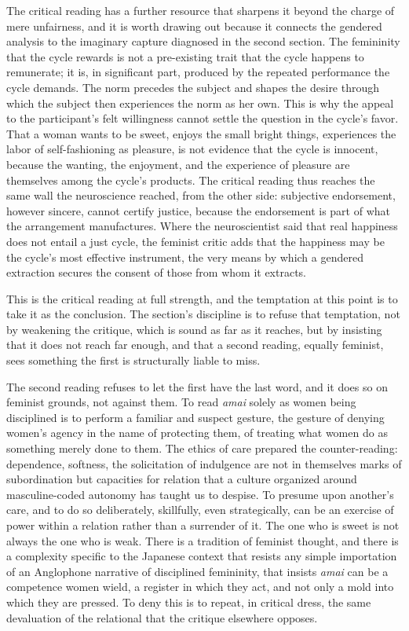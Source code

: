 The critical reading has a further resource that sharpens it beyond the charge of mere unfairness, and it is worth drawing out because it connects the gendered analysis to the imaginary capture diagnosed in the second section. The femininity that the cycle rewards is not a pre-existing trait that the cycle happens to remunerate; it is, in significant part, produced by the repeated performance the cycle demands. The norm precedes the subject and shapes the desire through which the subject then experiences the norm as her own. This is why the appeal to the participant's felt willingness cannot settle the question in the cycle's favor. That a woman wants to be sweet, enjoys the small bright things, experiences the labor of self-fashioning as pleasure, is not evidence that the cycle is innocent, because the wanting, the enjoyment, and the experience of pleasure are themselves among the cycle's products. The critical reading thus reaches the same wall the neuroscience reached, from the other side: subjective endorsement, however sincere, cannot certify justice, because the endorsement is part of what the arrangement manufactures. Where the neuroscientist said that real happiness does not entail a just cycle, the feminist critic adds that the happiness may be the cycle's most effective instrument, the very means by which a gendered extraction secures the consent of those from whom it extracts.

This is the critical reading at full strength, and the temptation at this point is to take it as the conclusion. The section's discipline is to refuse that temptation, not by weakening the critique, which is sound as far as it reaches, but by insisting that it does not reach far enough, and that a second reading, equally feminist, sees something the first is structurally liable to miss.

The second reading refuses to let the first have the last word, and it does so on feminist grounds, not against them. To read \textit{amai} solely as women being disciplined is to perform a familiar and suspect gesture, the gesture of denying women's agency in the name of protecting them, of treating what women do as something merely done to them. The ethics of care prepared the counter-reading: dependence, softness, the solicitation of indulgence are not in themselves marks of subordination but capacities for relation that a culture organized around masculine-coded autonomy has taught us to despise. To presume upon another's care, and to do so deliberately, skillfully, even strategically, can be an exercise of power within a relation rather than a surrender of it. The one who is sweet is not always the one who is weak. There is a tradition of feminist thought, and there is a complexity specific to the Japanese context that resists any simple importation of an Anglophone narrative of disciplined femininity, that insists \textit{amai} can be a competence women wield, a register in which they act, and not only a mold into which they are pressed. To deny this is to repeat, in critical dress, the same devaluation of the relational that the critique elsewhere opposes.

